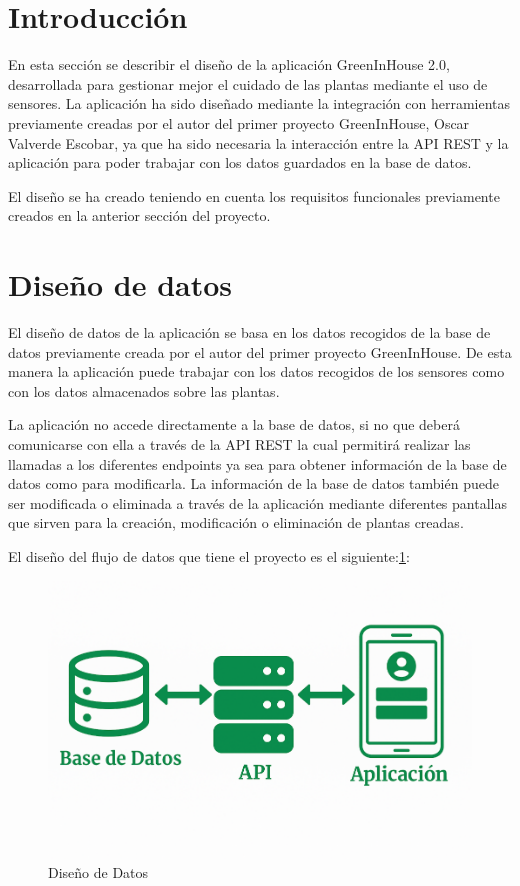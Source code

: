 
\section{Introducción}
En esta sección se describir el diseño de la aplicación GreenInHouse 2.0, desarrollada para gestionar mejor el cuidado de las plantas mediante el uso de sensores.
La aplicación ha sido diseñado mediante la integración con herramientas previamente creadas por el autor del primer proyecto GreenInHouse, Oscar Valverde Escobar, ya que ha sido necesaria la interacción entre la API REST y la aplicación para poder trabajar con los datos guardados en la base de datos.

El diseño se ha creado teniendo en cuenta los requisitos funcionales previamente creados en la anterior sección del proyecto.

\section{Diseño de datos}
El diseño de datos de la aplicación se basa en los datos recogidos de la base de datos previamente creada por el autor del primer proyecto GreenInHouse.
De esta manera la aplicación puede trabajar con los datos recogidos de los sensores como con los datos almacenados sobre las plantas.

La aplicación no accede directamente a la base de datos, si no que deberá comunicarse con ella a través de la API REST la cual permitirá realizar las llamadas a los diferentes endpoints ya sea para obtener información de la base de datos como para modificarla. La información de la base de datos también puede ser modificada o eliminada a través de la aplicación mediante diferentes pantallas que sirven para la creación, modificación o eliminación de plantas creadas. 

El diseño del flujo de datos que tiene el proyecto es el siguiente:\ref{D1}:
\begin{figure}[H]
    \centering
    \includegraphics[width=0.8\linewidth]{Intercambio_Datos.png}
    \caption{Diseño de Datos}
    \label{D1}
\end{figure}



